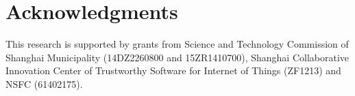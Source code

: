 \documentclass[11pt,a4paper]{article}
\begin{document}
\section*{Acknowledgments}

This research is supported by grants from Science and Technology Commission of Shanghai Municipality (14DZ2260800 and 15ZR1410700), Shanghai Collaborative Innovation Center of Trustworthy Software for Internet of Things (ZF1213) and NSFC (61402175).



%
%



\appendix

%
%
%
%
\end{document}
